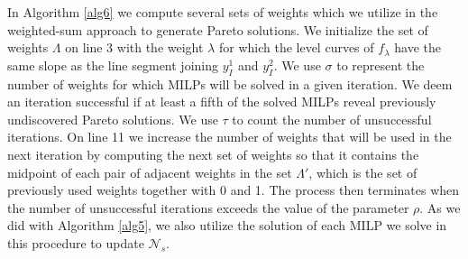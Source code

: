 \documentclass[11.5pt]{article}
\newcommand{\R}{\mathbb{R}}
\renewcommand{\P}{\mathbb{P}}
\newcommand{\N}{\mathcal{N}}
\newcommand{\OS}{\mathcal{OS}}
\begin{document}
In Algorithm \ref{alg6} we compute several sets of weights which we utilize in the weighted-sum approach to generate Pareto solutions. We initialize the set of weights $\Lambda$ on line 3 with the weight $\lambda$ for which the level curves of $f_\lambda$ have the same slope as the line segment joining $y_I^1$ and $y_I^2$. We use $\sigma$ to represent the number of weights for which MILPs will be solved in a given iteration. We deem an iteration successful if at least a fifth of the solved MILPs reveal previously undiscovered Pareto solutions. We use $\tau$ to count the number of unsuccessful iterations. On line 11 we increase the number of weights that will be used in the next iteration by computing the next set of weights so that it contains the midpoint of each pair of adjacent weights in the set $\Lambda'$, which is the set of previously used weights together with 0 and 1. The process then terminates when the number of unsuccessful iterations exceeds the value of the parameter $\rho$. As we did with Algorithm \ref{alg5}, we also utilize the solution of each MILP we solve in this procedure to update $\N_s$. 
%
\end{document}
